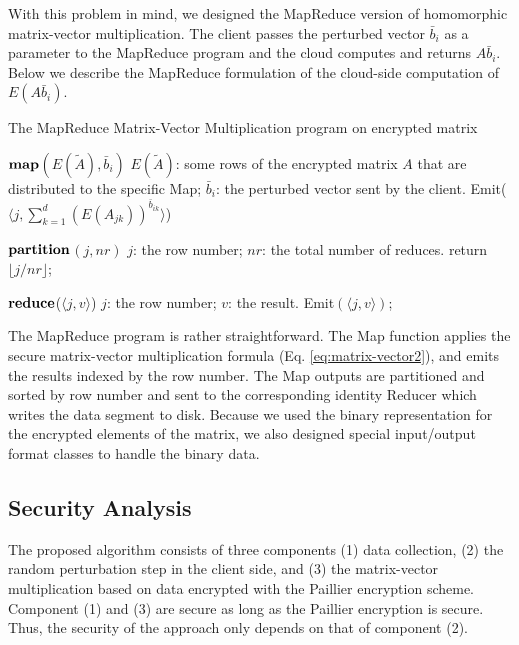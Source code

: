 \documentclass[10pt, conference, compsocconf]{IEEEtran}
\begin{document}
With this problem in mind, we designed the MapReduce version of homomorphic matrix-vector multiplication. The client passes the perturbed vector $\bar{b}_i$ as a parameter to the MapReduce program and the cloud computes and returns $A\bar{b}_i$. 
Below we describe the MapReduce formulation of the cloud-side computation of $E(A\bar{b}_i)$.

\newcommand{\map}{\ensuremath{\mbox{\bf map}}}
\newcommand{\reduce}{\ensuremath{\mbox{\bf reduce}}}
\newcommand{\partition}{\ensuremath{\mbox{\bf partition}}}
\begin{algorithm}[htb]

\caption{The MapReduce Matrix-Vector Multiplication program on encrypted matrix}
\begin{algorithmic}[1]
\STATE \map$(E(\tilde{A}), \bar{b}_i)$
\STATE $E(\tilde{A})$: some rows of the encrypted matrix $A$ that are distributed to the specific Map; $\bar{b}_i$: the perturbed vector sent by the client.
\STATE Emit($\langle j, \sum_{k=1}^d (E(A_{jk}))^{\bar{b}_{ik}} \rangle$)
\ENDFOR
\end{algorithmic}
\medskip
\begin{algorithmic}[1]
\STATE \partition$(j, nr)$
\STATE $j$: the row number; $nr$: the total number of reduces.
\STATE return $\lfloor j/nr \rfloor$;
\end{algorithmic}
\medskip
\begin{algorithmic}[1]
\STATE \reduce($\langle j, v \rangle$)
\STATE $j$: the row number; $v$: the result.
\STATE Emit$(\langle j, v\rangle )$;
\end{algorithmic}
\end{algorithm}

The MapReduce program is rather straightforward. The Map function applies the secure matrix-vector multiplication formula (Eq. \ref{eq:matrix-vector2}), and emits the results indexed by the row number. The Map outputs are partitioned and sorted by row number and sent to the corresponding identity Reducer which writes the data segment to disk. Because we used the binary representation for the encrypted elements of the matrix,  we also designed special input/output format classes to handle the binary data.   












\subsection{Security Analysis}
The proposed algorithm consists of three components (1) data collection, (2) the random perturbation step in the client side, and (3) the matrix-vector multiplication based on data encrypted with the Paillier encryption scheme. Component (1) and (3) are secure as long as the Paillier encryption is secure. 
Thus, the security of the approach only depends on that of component (2). 
\end{document}
